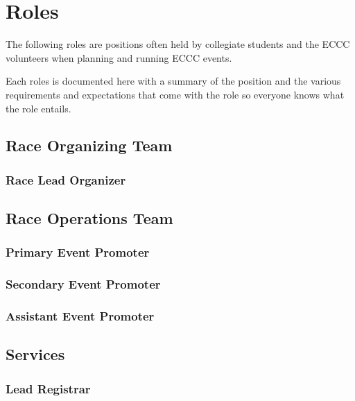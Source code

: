 \setchapterpreamble[u]{\margintoc}
\chapter{Roles}

The following roles are positions often held by collegiate students and the ECCC volunteers
when planning and running ECCC events.

Each roles is documented here with a summary of the position
and the various requirements and expectations that come with the role
so everyone knows what the role entails.



\section{Race Organizing Team}
\label{role:race_org_team}

\subsection{Race Lead Organizer}
\label{role:lead_org}

\section{Race Operations Team}
\label{role:race_ops_team}

\subsection{Primary Event Promoter}
\label{role:primary_promoter}

\subsection{Secondary Event Promoter}
\label{role:secondary_promoter}

\subsection{Assistant Event Promoter}
\label{role:assistant_promoter}

\section{Services}

\subsection{Lead Registrar}
\label{role:registrar}

